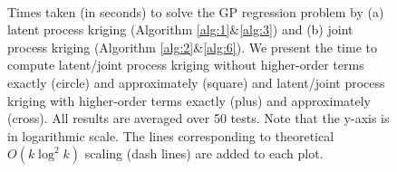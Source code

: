 \documentclass[article,ij4uq]{ij4uq}              %
\begin{document}
\begin{figure}[!t]
{\begin{minipage}[t]{0.30\textwidth}
  \end{minipage}}\\
  \caption{Times taken (in seconds) to solve the GP regression problem by (a) latent process kriging (Algorithm \ref{alg:1}\&\ref{alg:3}) and (b) joint process kriging (Algorithm \ref{alg:2}\&\ref{alg:6}). We present the time to compute latent/joint process kriging without higher-order terms exactly (circle) and approximately (square) and latent/joint process kriging with higher-order terms exactly (plus) and approximately (cross). All results are averaged over 50 tests. Note that the y-axis is in logarithmic scale. The lines corresponding to theoretical $O(k\log^{2}{k})$ scaling (dash lines) are added to each plot.}\label{fig:3_1} 
\end{figure}
\end{document}
